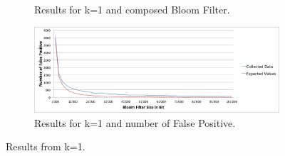 \documentclass[12]{scrartcl}
\begin{document}
\begin{figure}[H]
\begin{subfigure}[t]{\textwidth}
\begin{center}
		\end{center}
		\caption{Results for k=1 and composed Bloom Filter.}
	\end{subfigure}
	\begin{subfigure}[t]{\textwidth}
		\begin{center}
			\includegraphics[scale=0.3]{res/1-fp.png}
		\end{center}
		\caption{Results for k=1 and number of False Positive.}
	\end{subfigure}
	\caption{Results from k=1.}
\end{figure}
\end{document}
